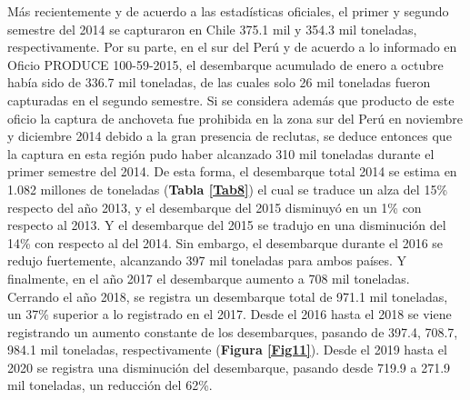 \documentclass[letter,11pt]{article}
\begin{document}
M\'as recientemente y de acuerdo a las estad\'isticas oficiales, el primer y
segundo semestre del 2014 se capturaron en Chile 375.1 mil y 354.3 mil
toneladas, respectivamente. Por su parte, en el sur del Per\'u y de
acuerdo a lo informado en Oficio PRODUCE 100-59-2015, el desembarque
acumulado de enero a octubre hab\'ia sido de 336.7 mil toneladas, de las
cuales solo 26 mil toneladas fueron capturadas en el segundo semestre.
Si se considera adem\'as que producto de este oficio la captura de
anchoveta fue prohibida en la zona sur del Per\'u en noviembre y diciembre
2014 debido a la gran presencia de reclutas, se deduce entonces que la
captura en esta regi\'on pudo haber alcanzado 310 mil toneladas durante el
primer semestre del 2014. De esta forma, el desembarque total 2014 se
estima en 1.082 millones de toneladas (\textbf{Tabla \ref{Tab8}}) el
cual se traduce un alza del 15\% respecto del a\~{n}o 2013, y el desembarque
del 2015 disminuy\'o en un 1\% con respecto al 2013. Y el desembarque del
2015 se tradujo en una disminuci\'on del 14\% con respecto al del 2014.
Sin embargo, el desembarque durante el 2016 se redujo fuertemente,
alcanzando 397 mil toneladas para ambos pa\'ises. Y finalmente, en el a\~{n}o
2017 el desembarque aumento a 708 mil toneladas. Cerrando el a\~{n}o 2018,
se registra un desembarque total de 971.1 mil toneladas, un 37\%
superior a lo registrado en el 2017. Desde el 2016 hasta el 2018 se
viene registrando un aumento constante de los desembarques, pasando de
397.4, 708.7, 984.1 mil toneladas, respectivamente
(\textbf{Figura \ref{Fig11}}). Desde el 2019 hasta el 2020 se registra
una disminuci\'on del desembarque, pasando desde 719.9 a 271.9 mil
toneladas, un reducci\'on del 62\%. \\

\newpage
\end{document}
